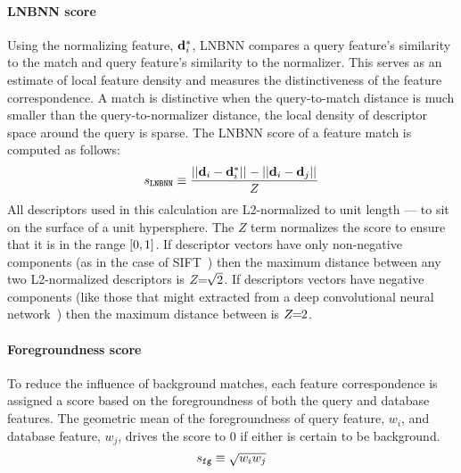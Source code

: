         \paragraph{LNBNN score}\label{sec:lnbnnscore}

            Using the normalizing feature, $\mathbf{d}^{*}_{i}$, LNBNN compares a query feature's similarity to the
              match and query feature's similarity to the normalizer.
            This serves as an estimate of local feature density and measures the distinctiveness of the feature
              correspondence.
            A match is distinctive when the query-to-match distance is much smaller than the query-to-normalizer
              distance, \ie{} the local density of descriptor space around the query is sparse.
            The LNBNN score of a feature match is computed as follows:
            \begin{equation}\label{eqn:lnbnn}
                s_{\tt{LNBNN}} \equiv \frac{||\mathbf{d}_i - \mathbf{d}^{*}_{i}||_{} - ||\mathbf{d}_i - \mathbf{d}_j||_{}}{Z}
            \end{equation}
            All descriptors used in this calculation are L2-normalized to unit length --- \ie{} to sit on the
              surface of a unit hypersphere.
            The $Z$ term normalizes the score to ensure that it is in the range $[0, 1]$.
            If descriptor vectors have only non-negative components (as in the case of
              SIFT~\cite{lowe_distinctive_2004}) then the maximum distance between any two L2-normalized
              descriptors is $Z\mkern-6mu=\mkern-6mu\sqrt{2}$.
            If descriptors vectors have negative components (like those that might extracted from a deep
              convolutional neural network~\cite{zagoruyko_learning_2015}) then the maximum distance between is
              $Z\mkern-6mu=\mkern-6mu2$.

        \paragraph{Foregroundness score}
            To reduce the influence of background matches, each feature correspondence is assigned a score based
              on the foregroundness of both the query and database features.
            The geometric mean of the foregroundness of query feature, $w_i$, and database feature, $w_j$, drives
              the score to $0$ if either is certain to be background.
            \begin{equation}
                s_{{\tt fg}} \equiv \sqrt{w_i w_j}
            \end{equation}


